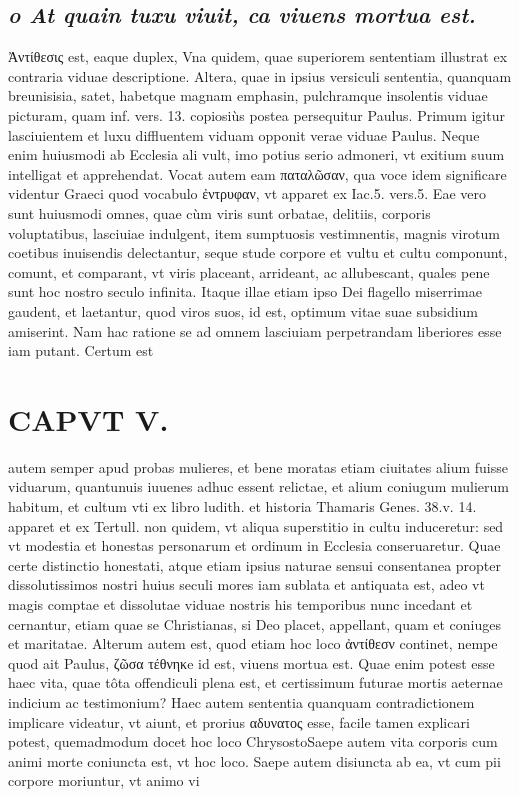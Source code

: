 \documentclass{article}
\begin{document}
\begin{pages}
\subsection*{\textit{o At quain tuxu viuit, ca viuens mortua est. }}\pstart Ἀντίθεσις est, eaque duplex, Vna quidem, quae superiorem sententiam illustrat ex contraria viduae descriptione. Altera, quae in ipsius versiculi sententia, quanquam breunisisia, satet, habetque magnam emphasin, pulchramque insolentis viduae picturam, quam inf. vers. 13. copiosiùs postea persequitur Paulus.  \pend\pstart Primum igitur lasciuientem et luxu diffluentem viduam opponit verae viduae Paulus. Neque enim huiusmodi ab Ecclesia ali vult, imo potius serio admoneri, vt exitium suum intelligat et apprehendat. Vocat autem eam παταλῶσαν, qua voce idem significare videntur Graeci quod vocabulo ἐντρυφαν, vt apparet ex Iac.5. vers.5. Eae vero sunt huiusmodi omnes, quae cùm viris sunt orbatae, delitiis, corporis voluptatibus, lasciuiae indulgent, item sumptuosis vestimnentis, magnis virotum coetibus inuisendis delectantur, seque stude corpore et vultu et cultu componunt, comunt, et comparant, vt viris placeant, arrideant, ac allubescant, quales pene sunt hoc nostro seculo infinita. Itaque illae etiam ipso Dei flagello miserrimae gaudent, et laetantur, quod viros suos, id est, optimum vitae suae subsidium amiserint. Nam hac ratione se ad omnem lasciuiam perpetrandam liberiores esse iam putant. Certum est  \pend
\section*{CAPVT  V. }
\marginpar{[ p.263 ]}\pstart autem semper apud probas mulieres, et bene moratas etiam ciuitates alium fuisse viduarum, quantunuis iuuenes adhuc essent relictae, et alium coniugum mulierum habitum, et cultum vti ex libro ludith. et historia Thamaris Genes. 38.v. 14. apparet et ex Tertull. non quidem, vt aliqua superstitio in cultu induceretur: sed vt modestia et honestas personarum et ordinum in Ecclesia conseruaretur. Quae certe distinctio honestati, atque etiam ipsius naturae sensui consentanea propter dissolutissimos nostri huius seculi mores iam sublata et antiquata est, adeo vt magis comptae et dissolutae viduae nostris his temporibus nunc incedant et cernantur, etiam quae se Christianas, si Deo placet, appellant, quam et coniuges et maritatae.  \pend\pstart Alterum autem est, quod etiam hoc loco ἀντίθεσν continet, nempe quod ait Paulus, ζῶσα τέθνηκe id est, viuens mortua est. Quae enim potest esse haec vita, quae tôta offendiculi plena est, et certissimum futurae mortis aeternae indicium ac testimonium? Haec autem sententia quanquam contradictionem implicare videatur, vt aiunt, et prorius αδυνατος esse, facile tamen explicari potest, quemadmodum docet hoc loco Chrysosto\pend\pstart Saepe autem vita corporis cum animi morte coniuncta est, vt hoc loco. Saepe autem disiuncta ab ea, vt cum pii corpore moriuntur, vt animo vi\pend

\end{pages}
\end{document}
